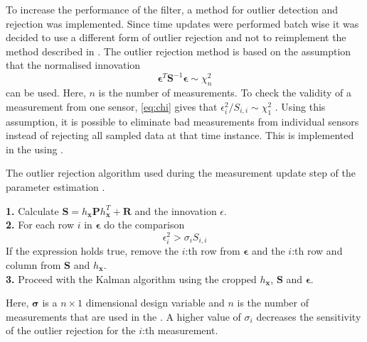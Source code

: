 To increase the performance of the filter, a method for outlier detection and rejection was implemented. Since time updates were performed batch wise it was decided to use a different form of outlier rejection and not to reimplement the method described in . The outlier rejection method is based on the assumption that the normalised innovation \begin{equation} \label{eq:chi}
\boldsymbol{\epsilon}^T \boldsymbol{S}^{-1} \boldsymbol{\epsilon} \sim \chi_{n}^{2}
\end{equation} can be used.
Here, $n$ is the number of measurements. To check the validity of a measurement from one sensor, \eqref{eq:chi} gives that $\epsilon_i^{2}/S_{i,i} \sim \chi_{1}^{2}$ \citep{sensorfusion}. Using this assumption, it is possible to eliminate bad measurements from individual sensors instead of rejecting all sampled data at that time instance. This is implemented in the \abbrEKF using .
\begin{algorithm}[h]
\caption{The outlier rejection algorithm used during the measurement update step of the parameter estimation \abbrEKF.}\label{alg:outlier}
\textbf{1.} Calculate $\boldsymbol{S}=h_{\boldsymbol{x}} \boldsymbol{P} h_{\boldsymbol{x}}^T + \boldsymbol{R}$ and the innovation $\epsilon$.
\\
\textbf{2.} For each row $i$ in $\boldsymbol{\epsilon}$ do the comparison
\begin{equation}
\epsilon_{i}^{2} > \sigma_i S_{i,i}
\end{equation}
If the expression holds true, remove the $i$:th row from $\boldsymbol{\epsilon}$ and the $i$:th row and column from $\boldsymbol{S}$ and $h_{\boldsymbol{x}}$.\\
\textbf{3.} Proceed with the Kalman algorithm using the cropped $h_{\boldsymbol{x}}$, $\boldsymbol{S}$ and $\boldsymbol{\epsilon}$.

Here, $\boldsymbol{\sigma}$ is a $n\times1$ dimensional design variable and $n$ is the number of measurements that are used in the \abbrEKF. A higher value of $\sigma_i$ decreases the sensitivity of the outlier rejection for the $i$:th measurement.
\end{algorithm}



